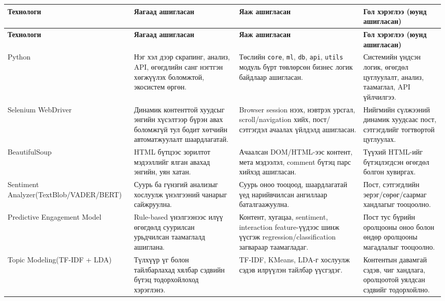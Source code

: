 \documentclass[12pt,a4paper]{report}
\begin{document}
\begin{landscape}
\begingroup
\scriptsize
\setlength{\tabcolsep}{4pt}
\begin{longtable}{|L{3.4cm}|L{4.6cm}|L{4.6cm}|L{8.8cm}|}
\hline
\textbf{Технологи} & \textbf{Яагаад ашигласан} & \textbf{Яаж ашигласан} & \textbf{Гол хэрэглээ (юунд ашигласан)} \\
\hline
\endfirsthead
\hline
\textbf{Технологи} & \textbf{Яагаад ашигласан} & \textbf{Яаж ашигласан} & \textbf{Гол хэрэглээ (юунд ашигласан)} \\
\hline
\endhead
\hline
Python & Нэг хэл дээр скрапинг, анализ, API, өгөгдлийн санг нэгтгэн хөгжүүлэх боломжтой, экосистем өргөн. & Төслийн \texttt{core}, \texttt{ml}, \texttt{db}, \texttt{api}, \texttt{utils} модуль бүрт төвлөрсөн бизнес логик байдлаар ашигласан. & Системийн үндсэн логик, өгөгдөл цуглуулалт, анализ, таамаглал, API үйлчилгээ. \\
\hline
Selenium WebDriver & Динамик контенттой хуудсыг энгийн хүсэлтээр бүрэн авах боломжгүй тул бодит хөтчийн автоматжуулалт шаардлагатай. & Browser session нээх, нэвтрэх урсгал, scroll/navigation хийх, пост/сэтгэгдэл ачаалах үйлдэлд ашигласан. & Нийгмийн сүлжээний динамик хуудсаас пост, сэтгэгдлийг тогтвортой цуглуулах. \\
\hline
BeautifulSoup & HTML бүтцээс зорилтот мэдээллийг ялган авахад энгийн, уян хатан. & Ачаалсан DOM/HTML-ээс контент, мета мэдээлэл, comment бүтэц парс хийхэд ашигласан. & Түүхий HTML-ийг бүтэцлэгдсэн өгөгдөл болгон хувиргах. \\
\hline
Sentiment Analyzer\newline (TextBlob/VADER/BERT) & Суурь ба гүнзгий анализыг хослуулж үнэлгээний чанарыг сайжруулна. & Суурь оноо тооцоод, шаардлагатай үед нарийвчилсан ангиллаар баталгаажуулна. & Пост, сэтгэгдлийн эерэг/сөрөг/саармаг хандлагыг тооцоолно. \\
\hline
Predictive Engagement Model & Rule-based үнэлгээнээс илүү өгөгдөлд суурилсан урьдчилсан таамаглалд ашиглана. & Контент, хугацаа, sentiment, interaction feature-үүдээс шинж үүсгэж regression/classification загвараар таамагладаг. & Пост тус бүрийн оролцооны оноо болон өндөр оролцооны магадлалыг тооцоолно. \\
\hline
Topic Modeling\newline (TF-IDF + LDA) & Түлхүүр үг болон тайлбарлахад хялбар сэдвийн бүтэц тодорхойлоход хэрэглэнэ. & TF-IDF, KMeans, LDA-г хослуулж сэдэв илрүүлэн тайлбар үүсгэдэг. & Контентын давамгай сэдэв, чиг хандлага, оролцоотой уялдсан сэдвийг тодорхойлно. \\

\end{longtable}
\end{landscape}
\end{document}
